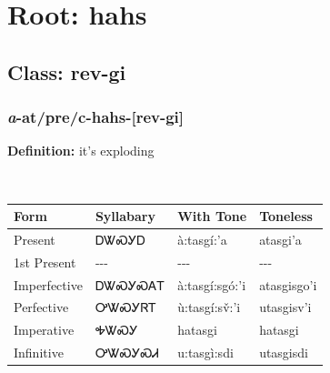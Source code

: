 \needspace{4in}
\section*{Root: hahs}
\nopagebreak
{}
\needspace{3in}
\subsection*{Class: rev-gi}
\nopagebreak
\needspace{2in}
\subsubsection*{\textit{a}{-}at/pre/c{-}\textbf{hahs}{-}[rev-gi]}
\nopagebreak
\textbf{Definition: } it{\textquoteright}s exploding
\\[0.5em]
\begin{tabularx}{\textwidth}{l X X X}%
\toprule%
\textbf{Form}&\textbf{Syllabary}&\textbf{With Tone}&\textbf{Toneless}\\%
\midrule%
Present&ᎠᏔᏍᎩᎠ&à:tasgí:’a&atasgi’a\\%
1st Present&{-}{-}{-}&{-}{-}{-}&{-}{-}{-}\\%
Imperfective&ᎠᏔᏍᎩᏍᎪᎢ&à:tasgí:sgó:’i&atasgisgo’i\\%
Perfective&ᎤᏔᏍᎩᏒᎢ&ù:tasgí:sv̌:’i&utasgisv’i\\%
Imperative&ᎭᏔᏍᎩ&hatasgi&hatasgi\\%
Infinitive&ᎤᏔᏍᎩᏍᏗ&u:tasgì:sdi&utasgisdi\\%
\bottomrule%
\end{tabularx}
\\[1em]